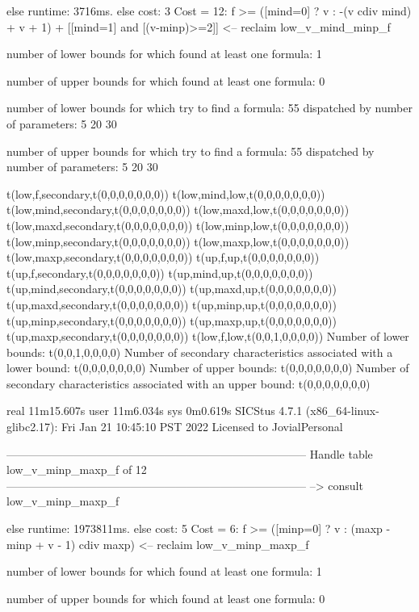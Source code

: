 else runtime: 3716ms. else cost: 3
Cost = 12:  f >= ([mind=0] ? v : -(v cdiv mind) + v + 1) + [[mind=1] and [(v-minp)>=2]] %
<-- reclaim low_v_mind_minp_f

number of lower bounds for which found at least one formula: 1

number of upper bounds for which found at least one formula: 0

number of lower bounds for which try to find a formula: 55
dispatched by number of parameters: 5  20  30

number of upper bounds for which try to find a formula: 55
dispatched by number of parameters: 5  20  30

t(low,f,secondary,t(0,0,0,0,0,0,0))
t(low,mind,low,t(0,0,0,0,0,0,0))
t(low,mind,secondary,t(0,0,0,0,0,0,0))
t(low,maxd,low,t(0,0,0,0,0,0,0))
t(low,maxd,secondary,t(0,0,0,0,0,0,0))
t(low,minp,low,t(0,0,0,0,0,0,0))
t(low,minp,secondary,t(0,0,0,0,0,0,0))
t(low,maxp,low,t(0,0,0,0,0,0,0))
t(low,maxp,secondary,t(0,0,0,0,0,0,0))
t(up,f,up,t(0,0,0,0,0,0,0))
t(up,f,secondary,t(0,0,0,0,0,0,0))
t(up,mind,up,t(0,0,0,0,0,0,0))
t(up,mind,secondary,t(0,0,0,0,0,0,0))
t(up,maxd,up,t(0,0,0,0,0,0,0))
t(up,maxd,secondary,t(0,0,0,0,0,0,0))
t(up,minp,up,t(0,0,0,0,0,0,0))
t(up,minp,secondary,t(0,0,0,0,0,0,0))
t(up,maxp,up,t(0,0,0,0,0,0,0))
t(up,maxp,secondary,t(0,0,0,0,0,0,0))
t(low,f,low,t(0,0,1,0,0,0,0))
Number of lower bounds:                                             t(0,0,1,0,0,0,0)
Number of secondary characteristics associated with a lower bound:  t(0,0,0,0,0,0,0)
Number of upper bounds:                                             t(0,0,0,0,0,0,0)
Number of secondary characteristics associated with an upper bound: t(0,0,0,0,0,0,0)

real	11m15.607s
user	11m6.034s
sys	0m0.619s
SICStus 4.7.1 (x86_64-linux-glibc2.17): Fri Jan 21 10:45:10 PST 2022
Licensed to JovialPersonal


--------------------------------------------------------------------------------
Handle table low_v_minp_maxp_f of 12
--------------------------------------------------------------------------------
--> consult low_v_minp_maxp_f

else runtime: 1973811ms. else cost: 5
Cost =  6:  f >= ([minp=0] ? v : (maxp - minp + v - 1) cdiv maxp) %
<-- reclaim low_v_minp_maxp_f

number of lower bounds for which found at least one formula: 1

number of upper bounds for which found at least one formula: 0

